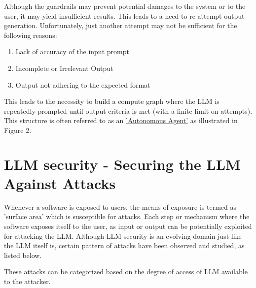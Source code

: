 \documentclass[12pt]{article}
\begin{document}
    Although the guardrails may prevent potential damages to the system or to the user, it may yield insufficient results.
    This leads to a need to re-attempt output generation. Unfortunately, just another attempt may not be sufficient for the following reasons:
    \begin{enumerate}[label=\alph*)]
        \item Lack of accuracy of the input prompt
        \item Incomplete or Irrelevant Output
        \item Output not adhering to the expected format
    \end{enumerate}
    This leads to the necessity to build a compute graph where the LLM is repeatedly prompted until output criteria is met (with a finite limit on attempts). This structure is often referred to as an \href{https://www.promptingguide.ai/research/llm-agents}{'Autonomous Agent'} as illustrated in Figure 2.


    \section{LLM security - Securing the LLM Against Attacks}
    Whenever a software is exposed to users, the means of exposure is termed as 'surface area' which is susceptible for attacks. Each step or mechanism where the software exposes itself to the user, as input or output can be potentially exploited for attacking the LLM. Although LLM security is an evolving domain just like the LLM itself is, certain pattern of attacks have been observed and studied, as listed below.

    These attacks can be categorized based on the degree of access of LLM available to the attacker.
\end{document}

